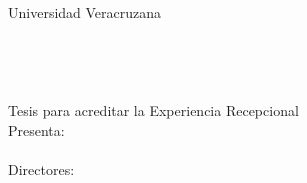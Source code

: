 \begin{flushleft}
  {\GilliusSiete Universidad Veracruzana}\\[12pt]
  {\GilliusOcho \facultad \\ \region}\\[12pt]
  {\GilliusOcho \programa}\\[12pt]
  {\GilliusNueve \titulo}\\[12pt]
  {\GilliusOcho Tesis para acreditar la Experiencia Recepcional}\\[12pt]
  {\GilliusOcho Presenta: \\ \alumno}\\[12pt]
  {\GilliusOcho Directores: \\ \DirectorUno \\ \DirectorDos}\\[12pt]
\end{flushleft}
